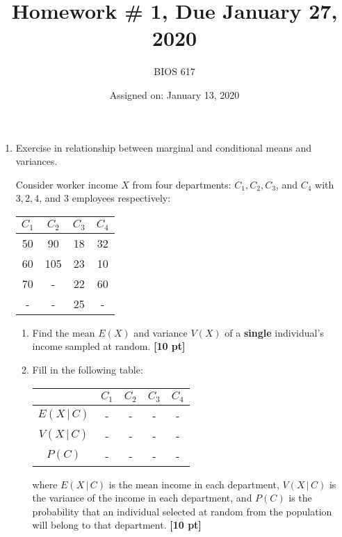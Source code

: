 \documentclass[12pt]{article}
\def\given{\, | \,}
\begin{document}
\title{Homework \# 1, Due January 27, 2020}
\author{BIOS 617}
\date{Assigned on: January 13, 2020}

\maketitle

\begin{enumerate}
\setlength{\itemsep}{15pt}%
\setlength{\parskip}{15pt}%

\item Exercise in relationship between marginal and conditional means and variances.

Consider worker income $X$ from four departments: $C_1, C_2, C_3$, and $C_4$ with $3, 2, 4$, and $3$ employees respectively:

\begin{table}[!th]
\centering
\begin{tabular}{| c c c c |}
\hline
$C_1$ & $C_2$ & $C_3$ & $C_4$ \\ \hline
50 & 90 & 18 & 32 \\
60 & 105 & 23 & 10 \\
70 & - & 22 & 60 \\
- & - & 25 & - \\ \hline
\end{tabular}
\end{table}

	\begin{enumerate}
		\setlength{\itemsep}{15pt}%
		\setlength{\parskip}{15pt}%

		\item Find the mean $E(X)$ and variance $V(X)$ of a {\bf single} individual's income sampled at random. {\bf [10 pt]}
		\item Fill in the following table:
		\begin{table}[!th]
		\centering
		\begin{tabular}{| c | c c c c |} \hline
		& $C_1$ & $C_2$ & $C_3$ & $C_4$ \\ \hline
		$E(X \given C)$ & - & - & - & - \\
		$V(X \given C)$ & - & - & - & - \\
		$P(C)$ & - & - & - & - \\ \hline
		\end{tabular}
		\end{table}

		where $E ( X \given C )$ is the mean income in each department, $V ( X \given C )$ is the variance of the income in each department, and $P ( C )$ is the probability that an individual selected at random from the population will belong to that department. {\bf [10 pt]}


\end{enumerate}
\end{enumerate}
\end{document}
